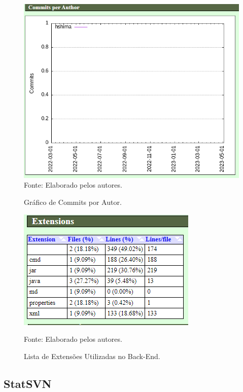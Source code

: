 \documentclass[
    12pt,               %
    openright,          %
    oneside,
    a4paper,            %
    BIBLATEX,           %
    TODO,               %
    english,            %
    brazil              %
    ]{ifsp-spo-inf-ctds}
\begin{document}
            \begin{figure}[H]
                \centering
                \caption{Gráfico de Commits por Autor.}
                \includegraphics[width=1 \textwidth]{Gitstats/back-end/commitsAutorBack.png}
                {\footnotesize Fonte: Elaborado pelos autores.}
                \label{fig:commitBack}
            \end{figure}
            
            \begin{figure}[H]
                \centering
                \caption{Lista de Extensões Utilizadas no Back-End.}
                \includegraphics[scale = 1.2]{Gitstats/back-end/extensoesBack.png}
                
                {\footnotesize Fonte: Elaborado pelos autores.}
                \label{fig:extensoesBack}
            \end{figure}
    
    
\subsection{StatSVN}
\end{document}
